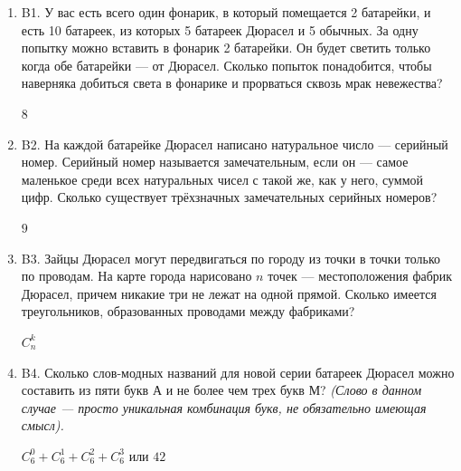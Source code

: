 \documentclass[12pt]{article}
\newenvironment{problem}{}{}
\newenvironment{sol}{}{} %
\begin{document}
\begin{enumerate}
\begin{problem}
\item[B1.] У вас есть всего один фонарик, в который помещается 2 батарейки, и есть 10 батареек, из которых 5 батареек Дюрасел и 5 обычных. За одну попытку можно вставить в фонарик 2 батарейки. Он будет светить только когда обе батарейки — от Дюрасел. Сколько попыток понадобится, чтобы наверняка добиться света в фонарике и прорваться сквозь мрак невежества?

\begin{sol}
$8$
\end{sol}
\end{problem}

\begin{problem}
\item[B2.] На каждой батарейке Дюрасел написано натуральное число — серийный номер. Серийный номер называется замечательным, если он — самое маленькое среди всех натуральных чисел с такой же, как у него, суммой цифр. Сколько существует трёхзначных замечательных серийных номеров?

\begin{sol}
$9$
\end{sol}
\end{problem}

\begin{problem}
\item[B3.]  Зайцы Дюрасел могут передвигаться по городу из точки в точки только по проводам. На карте города нарисовано $n$ точек — местоположения фабрик Дюрасел, причем никакие три не лежат на одной прямой. Сколько имеется треугольников, образованных проводами между фабриками?

\begin{sol}
$C^k_n$
\end{sol}
\end{problem}

\begin{problem}
\item[B4.] Сколько слов-модных названий для новой серии батареек Дюрасел можно составить из пяти букв А и не более чем трех букв М? \textit{(Слово в данном случае --- просто уникальная комбинация букв, не обязательно имеющая смысл).}

\begin{sol}
$C^0_6 + C^1_6 + C^2_6 + C^3_6$ или $42$
\end{sol}
\end{problem}

  
\end{enumerate}
\end{document}
